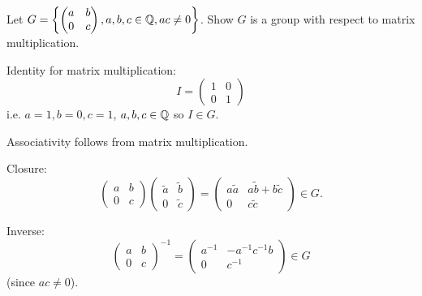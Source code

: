 \documentclass[10pt, a4paper]{article}
\begin{document}
\begin{problem}
    Let $G = \left\{\begin{pmatrix}
        a & b \\ 0 & c
    \end{pmatrix}, a, b, c \in \mathbb{Q}, ac \neq 0\right\}$.
    Show $G$ is a group with respect to matrix multiplication.

    \begin{solution}
        Identity for matrix multiplication:
        \[
        I = \begin{pmatrix}
            1 & 0 \\ 0 & 1
        \end{pmatrix}
        \]
        i.e. $a = 1, b = 0, c = 1$,
        $a, b, c \in \mathbb{Q}$ so $I \in G$.

        Associativity follows from matrix multiplication.

        Closure:
        \[
        \begin{pmatrix}
            a & b \\ 0 & c
        \end{pmatrix}\begin{pmatrix}
            \tilde{a} & \tilde{b} \\ 0 & \tilde{c}
        \end{pmatrix} = \begin{pmatrix}
            a\tilde{a} & a\tilde{b} + b\tilde{c} \\
            0 & c\tilde{c}
        \end{pmatrix} \in G.
        \]

        Inverse:
        \[
        \begin{pmatrix}
            a & b \\ 0 & c
        \end{pmatrix} ^ {-1} = \begin{pmatrix}
            a ^ {-1} & -a ^ {-1}c ^ {-1}b \\ 0 & c ^ {-1}
        \end{pmatrix} \in G
        \]
        (since $ac \neq 0$).
    \end{solution}
\end{problem}
\end{document}
